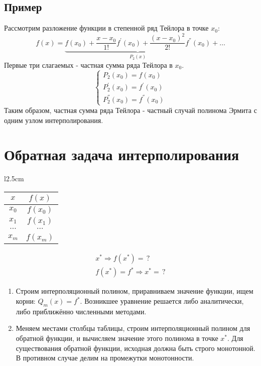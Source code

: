 \documentclass[a4paper,11pt]{article}
\begin{document}
  \subsection{Пример}
  Рассмотрим разложение функции в степенной ряд Тейлора в точке $x_0$:
  \[f(x) = \underbrace{f(x_0) + \frac{x - x_0}{1!}f^{'}(x_0) + \frac{(x - x_0)^2}{2!}f^{''}(x_0)}_{P_2(x)} + \dots\]
  Первые три слагаемых - частная сумма ряда Тейлора в $x_0$.
  \begin{equation*}
    \begin{cases}
      P_2(x_0) = f(x_0) \\
      P^{'}_2(x_0) = f^{'}(x_0) \\
      P^{''}_2(x_0) = f^{''}(x_0)
    \end{cases}
  \end{equation*}
  Таким образом, частная сумма ряда Тейлора - частный случай полинома Эрмита с одним узлом интерполирования.

\section{Обратная задача интерполирования}
\begin{minipage}{1\linewidth}
  \begin{wraptable}{l}{2.5cm}
    \begin{tabular}{ c|c }
      $x$ & $f(x)$ \\
      \hline
      $x_0$ & $f(x_0)$ \\
      $x_1$ & $f(x_1)$ \\
      $\cdots$ & $\cdots$ \\
      $x_m$ & $f(x_m)$
    \end{tabular}
  \end{wraptable}

  \begin{gather*}
    x^* \Rightarrow f(x^*) = \,? \\
    f(x^*) = f^* \Rightarrow x^* = \,?
  \end{gather*}
\end{minipage}
\vspace{1cm}
\begin{enumerate}
  \item Строим интерполяционный полином, приравниваем значение функции, ищем корни: $Q_m(x) = f^*$. Возникшее уравнение решается либо аналитически,
        либо приближённо численными методами.
  \item Меняем местами столбцы таблицы, строим интерполяционный полином для обратной функции, и вычисляем значение этого полинома в точке $x^*$. Для существования
        обратной функции, исходная должна быть строго монотонной. В противном случае делим на промежутки монотонности.
\end{enumerate}
\end{document}
